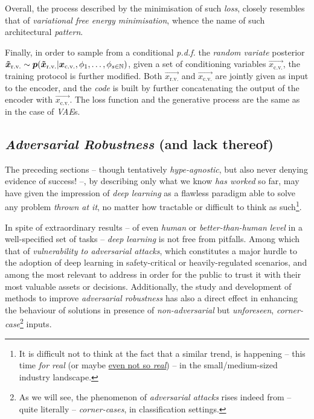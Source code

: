 Overall, the process described by the minimisation of such \textit{loss}, closely resembles that of \textit{variational free energy minimisation}, whence the name of such architectural \textit{pattern}.

Finally, in order to sample from a conditional \textit{p.d.f.} the \textit{random variate} posterior\linebreak
${\bm{\tilde{x}_{\text{r.v.}}} \sim \bm{p}(\bm{\tilde{x}_{\text{r.v.}}} | \bm{{x}_{\text{c.v.}}}, \phi_1, \dots, \phi_{s\in\mathbb{N}})}$, given a set of conditioning variables $\vec{{x}_{\text{c.v.}}}$, the training protocol is further modified. Both $\vec{{x}_{\text{r.v.}}}$ and $\vec{{x}_{\text{c.v.}}}$ are jointly given as input to the encoder, and the \textit{code} is built by further concatenating the output of the encoder with $\vec{{x}_{\text{c.v.}}}$. The loss function and the generative process are the same as in the case of \textit{VAE}s.

\subsection{\textit{Adversarial Robustness} (and lack thereof)}

The preceding sections -- though tentatively \textit{hype-agnostic}, but also never denying evidence of success! --, by describing only what we know \textit{has worked} so far, may have given the impression of \textit{deep learning} as a flawless paradigm able to solve any problem \textit{thrown at it}, no matter how tractable or difficult to think as such\footnote{It is difficult not to think at the fact that a similar trend, is happening -- this time \textit{for real} (or maybe \href{https://www.ft.com/content/21b19010-3e9f-11e9-b896-fe36ec32aece}{even not so \textit{real}}) -- in the small/medium-sized industry landscape.}.

In spite of extraordinary results -- of even \textit{human} or \textit{better-than-human} \textit{level} in a well-specified set of tasks -- \textit{deep learning} is not free from pitfalls. Among which that of \textit{vulnerability to adversarial attacks}, which constitutes a major hurdle to the adoption of deep learning in safety-critical or heavily-regulated scenarios, and among the most relevant to address in order for the public to trust it with their most valuable assets or decisions. Additionally, the study and development of methods to improve \textit{adversarial robustness} has also a direct effect in enhancing the behaviour of solutions in presence of \textit{non-adversarial} but \textit{unforeseen}, \textit{corner-case}\footnote{As we will see, the phenomenon of \textit{adversarial attacks} rises indeed from -- quite literally -- \textit{corner-cases}, in classification settings.} inputs.

